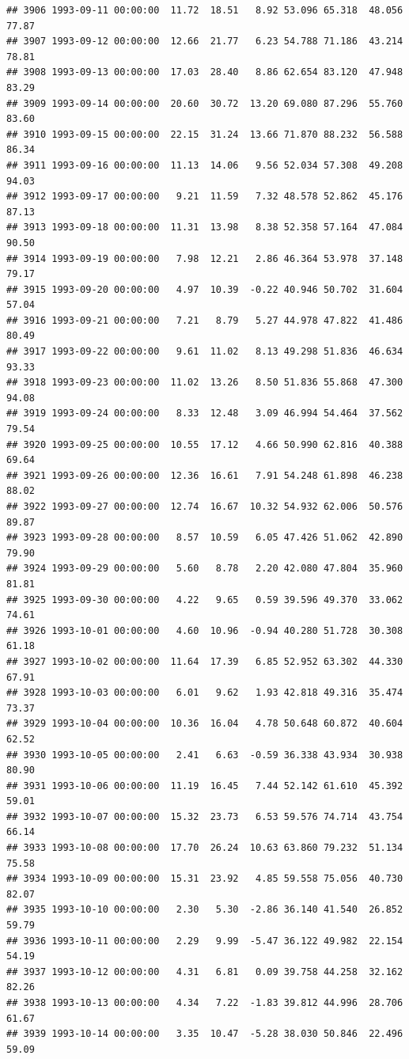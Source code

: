 \documentclass{article}\usepackage{graphicx, color}
\makeatletter
\newenvironment{kframe}{%
 \def\at@end@of@kframe{}%
 \ifinner\ifhmode%
  \def\at@end@of@kframe{\end{minipage}}%
  \begin{minipage}{\columnwidth}%
 \fi\fi%
 \def\FrameCommand##1{\hskip\@totalleftmargin \hskip-\fboxsep
 \colorbox{shadecolor}{##1}\hskip-\fboxsep
     \hskip-\linewidth \hskip-\@totalleftmargin \hskip\columnwidth}%
 \MakeFramed {\advance\hsize-\width
   \@totalleftmargin\z@ \linewidth\hsize
   \@setminipage}}%
 {\par\unskip\endMakeFramed%
 \at@end@of@kframe}
\newenvironment{knitrout}{}{} %
\makeatother
\begin{document}
\begin{knitrout}
\begin{kframe}
\begin{verbatim}
## 3906 1993-09-11 00:00:00  11.72  18.51   8.92 53.096 65.318  48.056  77.87
## 3907 1993-09-12 00:00:00  12.66  21.77   6.23 54.788 71.186  43.214  78.81
## 3908 1993-09-13 00:00:00  17.03  28.40   8.86 62.654 83.120  47.948  83.29
## 3909 1993-09-14 00:00:00  20.60  30.72  13.20 69.080 87.296  55.760  83.60
## 3910 1993-09-15 00:00:00  22.15  31.24  13.66 71.870 88.232  56.588  86.34
## 3911 1993-09-16 00:00:00  11.13  14.06   9.56 52.034 57.308  49.208  94.03
## 3912 1993-09-17 00:00:00   9.21  11.59   7.32 48.578 52.862  45.176  87.13
## 3913 1993-09-18 00:00:00  11.31  13.98   8.38 52.358 57.164  47.084  90.50
## 3914 1993-09-19 00:00:00   7.98  12.21   2.86 46.364 53.978  37.148  79.17
## 3915 1993-09-20 00:00:00   4.97  10.39  -0.22 40.946 50.702  31.604  57.04
## 3916 1993-09-21 00:00:00   7.21   8.79   5.27 44.978 47.822  41.486  80.49
## 3917 1993-09-22 00:00:00   9.61  11.02   8.13 49.298 51.836  46.634  93.33
## 3918 1993-09-23 00:00:00  11.02  13.26   8.50 51.836 55.868  47.300  94.08
## 3919 1993-09-24 00:00:00   8.33  12.48   3.09 46.994 54.464  37.562  79.54
## 3920 1993-09-25 00:00:00  10.55  17.12   4.66 50.990 62.816  40.388  69.64
## 3921 1993-09-26 00:00:00  12.36  16.61   7.91 54.248 61.898  46.238  88.02
## 3922 1993-09-27 00:00:00  12.74  16.67  10.32 54.932 62.006  50.576  89.87
## 3923 1993-09-28 00:00:00   8.57  10.59   6.05 47.426 51.062  42.890  79.90
## 3924 1993-09-29 00:00:00   5.60   8.78   2.20 42.080 47.804  35.960  81.81
## 3925 1993-09-30 00:00:00   4.22   9.65   0.59 39.596 49.370  33.062  74.61
## 3926 1993-10-01 00:00:00   4.60  10.96  -0.94 40.280 51.728  30.308  61.18
## 3927 1993-10-02 00:00:00  11.64  17.39   6.85 52.952 63.302  44.330  67.91
## 3928 1993-10-03 00:00:00   6.01   9.62   1.93 42.818 49.316  35.474  73.37
## 3929 1993-10-04 00:00:00  10.36  16.04   4.78 50.648 60.872  40.604  62.52
## 3930 1993-10-05 00:00:00   2.41   6.63  -0.59 36.338 43.934  30.938  80.90
## 3931 1993-10-06 00:00:00  11.19  16.45   7.44 52.142 61.610  45.392  59.01
## 3932 1993-10-07 00:00:00  15.32  23.73   6.53 59.576 74.714  43.754  66.14
## 3933 1993-10-08 00:00:00  17.70  26.24  10.63 63.860 79.232  51.134  75.58
## 3934 1993-10-09 00:00:00  15.31  23.92   4.85 59.558 75.056  40.730  82.07
## 3935 1993-10-10 00:00:00   2.30   5.30  -2.86 36.140 41.540  26.852  59.79
## 3936 1993-10-11 00:00:00   2.29   9.99  -5.47 36.122 49.982  22.154  54.19
## 3937 1993-10-12 00:00:00   4.31   6.81   0.09 39.758 44.258  32.162  82.26
## 3938 1993-10-13 00:00:00   4.34   7.22  -1.83 39.812 44.996  28.706  61.67
## 3939 1993-10-14 00:00:00   3.35  10.47  -5.28 38.030 50.846  22.496  59.09

\end{verbatim}
\end{kframe}
\end{knitrout}
\end{document}
